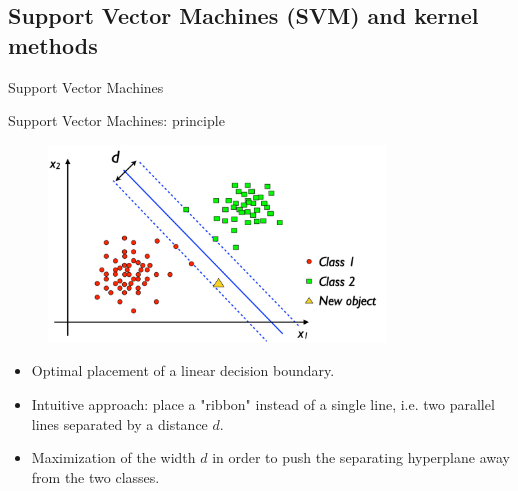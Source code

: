 \documentclass[xcolor=pdftex,dvipsnames,table]{beamer}
\begin{document}

\subsection{Support Vector Machines (SVM) and kernel methods}
\begin{frame}[plain,c]
\begin{center}
\Huge Support Vector Machines
\end{center}
\end{frame}

\begin{frame}{Support Vector Machines: principle}
	\begin{figure}[htb]
		\includegraphics[width=0.8\textwidth]{../graphics/SVM_general.pdf}
	\end{figure}
	\begin{itemize}
		\item Optimal placement of a linear decision boundary.
		\item Intuitive approach: place a "ribbon" instead of a single line, i.e. two parallel lines separated by a distance $d$.
		\item Maximization of the width $d$ in order to push the separating hyperplane away from the two classes.
	\end{itemize}
\end{frame}
\end{document}
